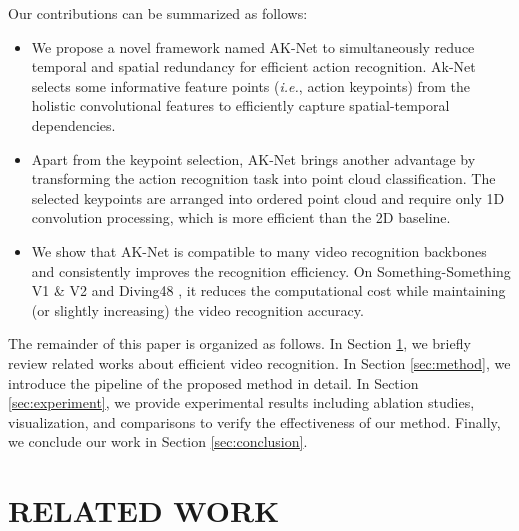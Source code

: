 \documentclass[journal]{IEEEtran}
\begin{document}
Our contributions can be summarized as follows:
\begin{itemize}
    \item We propose a novel framework named AK-Net to simultaneously reduce temporal and spatial redundancy for efficient action recognition. Ak-Net selects some informative feature points (\emph{i.e.}, action keypoints) from the holistic convolutional features to efficiently capture spatial-temporal dependencies. 
    \item Apart from the keypoint selection, AK-Net brings another advantage by transforming the action recognition task into point cloud classification. The selected keypoints are arranged into ordered point cloud and require only 1D convolution processing, which is more efficient than the 2D baseline. 
    \item We show that AK-Net is compatible to many video recognition backbones and consistently improves the recognition efficiency. On Something-Something V1 \& V2 \cite{goyal2017something} and Diving48 \cite{li2018resound}, it reduces the computational cost while maintaining (or slightly increasing) the video recognition accuracy. 
\end{itemize}

The remainder of this paper is organized as follows.
In Section \ref{sec:relatedwork}, we briefly review related works about efficient video recognition.
In Section \ref{sec:method}, we introduce the pipeline of the proposed method in detail.
In Section \ref{sec:experiment}, we provide experimental results including ablation studies, visualization, and comparisons to verify the effectiveness of our method.
Finally, we conclude our work in Section \ref{sec:conclusion}.

\section{RELATED WORK} \label{sec:relatedwork}
\end{document}
